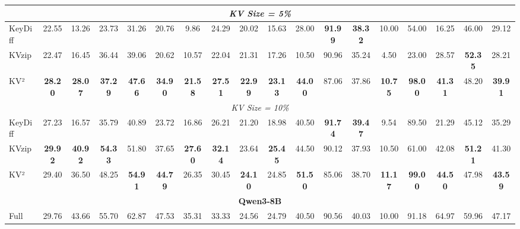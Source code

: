 \documentclass[11pt]{article}
\begin{document}
\begin{table}[htbp]
\begin{tabular}{l|ccc|ccc|ccc|ccc|cc|cc|c}
\midrule
\multicolumn{18}{c}{\textit{KV Size = 5\%}} \\
\midrule

KeyDiff 
    & 22.55 & 13.26 & 23.73
    & 31.26 & 20.76 & 9.86
    & 24.29 & 20.02 & 15.63
    & 28.00 & \textbf{91.99} & \textbf{38.32}
    & 10.00 & 54.00
    & 16.25 & 46.00
    & 29.12 \\

KVzip 
    & 22.47 & 16.45 & 36.44
    & 39.06 & 20.62 & 10.57
    & 22.04 & 21.31 & 17.26
    & 10.50 & 90.96 & 35.24
    & 4.50 & 23.00
    & 28.57 & \textbf{52.35}
    & 28.21 \\

KV²
    & \textbf{28.20} & \textbf{28.07} & \textbf{37.29}
    & \textbf{47.66} & \textbf{34.90} & \textbf{21.58}
    & \textbf{27.51} & \textbf{22.99} & \textbf{23.13}
    & \textbf{44.00} & 87.06 & 37.86
    & \textbf{10.75} & \textbf{98.00}
    & \textbf{41.31} & 48.20
    & \textbf{39.91} \\

\midrule
\multicolumn{18}{c}{\textit{KV Size = 10\%}} \\
\midrule

KeyDiff 
    & 27.23 & 16.57 & 35.79
    & 40.89 & 23.72 & 16.86
    & 26.21 & 21.20 & 18.98
    & 40.50 & \textbf{91.74} & \textbf{39.47}
    & 9.54 & 89.50
    & 21.29 & 45.12
    & 35.29 \\

KVzip 
    & \textbf{29.92} & \textbf{40.92} & \textbf{54.33}
    & 51.80 & 37.65 & \textbf{27.60}
    & \textbf{32.14} & 23.64 & \textbf{25.45}
    & 44.50 & 90.12 & 37.93
    & 10.50 & 61.00
    & 42.08 & \textbf{51.21}
    & 41.30 \\

KV² 
    & 29.40 & 36.50 & 48.25
    & \textbf{54.91} & \textbf{44.79} & 26.35
    & 30.45 & \textbf{24.10} & 24.85
    & \textbf{51.50} & 85.06 & 38.70
    & \textbf{11.17} & \textbf{99.00}
    & \textbf{44.50} & 47.98
    & \textbf{43.59} \\

\midrule
\multicolumn{18}{c}{\textbf{Qwen3-8B}} \\
\midrule

Full
    & 29.76 & 43.66 & 55.70
    & 62.87 & 47.53 & 35.31
    & 33.33 & 24.56 & 24.79
    & 40.50 & 90.56 & 40.03
    & 10.00 & 91.18
    & 64.97 & 59.96
    & 47.17 \\


\end{tabular}
\end{table}
\end{document}
